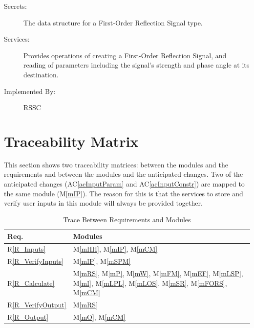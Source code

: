 \documentclass[12pt, titlepage]{article}
\newcommand{\acref}[1]{AC\ref{#1}}
\newcommand{\mref}[1]{M\ref{#1}}
\begin{document}
\begin{description}
\item[Secrets:]The data structure for a First-Order Reflection Signal type.
\item[Services:]Provides operations of creating a First-Order Reflection Signal, and reading of parameters including the signal's strength and phase angle at its destination. 
\item[Implemented By:] RSSC
\end{description}

\section{Traceability Matrix} \label{SecTM}

This section shows two traceability matrices: between the modules and the
requirements and between the modules and the anticipated changes. Two of the anticipated changes (\acref{acInputParam} and \acref{acInputConstr}) are mapped to the same module (\mref{mIP}). The reason for this is that the services to store and verify user inputs in this module will always be provided together.


\begin{table}[H]
\centering
\begin{tabular}{p{} p{}}
\toprule
\textbf{Req.} & \textbf{Modules}\\
\midrule
R\ref{R_Inputs} & \mref{mHH}, \mref{mIP}, \mref{mCM}\\
R\ref{R_VerifyInputs} & \mref{mIP}, \mref{mSPM}\\
R\ref{R_Calculate} & \mref{mRS}, \mref{mP}, \mref{mW}, \mref{mFM}, \mref{mEF}, \mref{mLSP}, \mref{mI}, \mref{mLPL}, \mref{mLOS}, \mref{mSR}, \mref{mFORS}, \mref{mCM}\\
R\ref{R_VerifyOutput} & \mref{mRS}\\
R\ref{R_Output} & \mref{mO}, \mref{mCM}\\
\bottomrule
\end{tabular}
\caption{Trace Between Requirements and Modules}
\label{TblRT}
\end{table}
\end{document}
